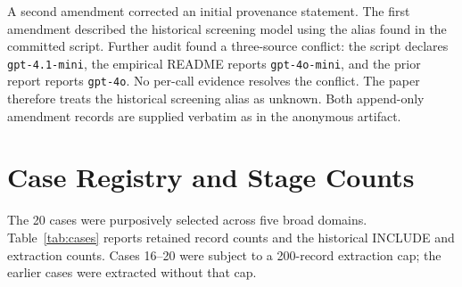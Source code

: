 \documentclass[acmsmall,anonymous,review]{acmart}
\begin{document}
A second amendment corrected an initial provenance statement. The first amendment described the historical screening model using the alias found in the committed script. Further audit found a three-source conflict: the script declares \texttt{gpt-4.1-mini}, the empirical README reports \texttt{gpt-4o-mini}, and the prior report reports \texttt{gpt-4o}. No per-call evidence resolves the conflict. The paper therefore treats the historical screening alias as unknown. Both append-only amendment records are supplied verbatim as  in the anonymous artifact.

\section{Case Registry and Stage Counts}

The 20 cases were purposively selected across five broad domains. Table~\ref{tab:cases} reports retained record counts and the historical INCLUDE and extraction counts. Cases 16--20 were subject to a 200-record extraction cap; the earlier cases were extracted without that cap.
\end{document}
